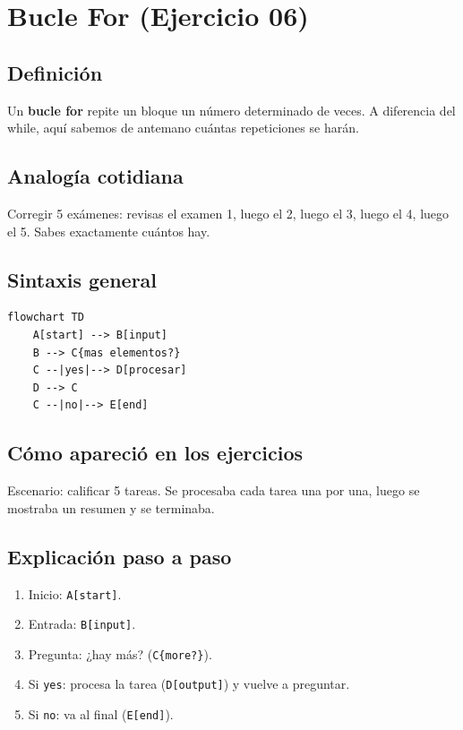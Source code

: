 \documentclass[12pt]{article}
\begin{document}
\newpage

\section{Bucle For (Ejercicio 06)}

\subsection{Definición}

Un \textbf{bucle for} repite un bloque un número determinado de veces. A diferencia del while, aquí sabemos de antemano cuántas repeticiones se harán.

\subsection{Analogía cotidiana}

Corregir 5 exámenes: revisas el examen 1, luego el 2, luego el 3, luego el 4, luego el 5. Sabes exactamente cuántos hay.

\subsection{Sintaxis general}

\begin{lstlisting}[style=mermaidstyle]
flowchart TD
    A[start] --> B[input]
    B --> C{mas elementos?}
    C --|yes|--> D[procesar]
    D --> C
    C --|no|--> E[end]
\end{lstlisting}

\subsection{Cómo apareció en los ejercicios}

Escenario: calificar 5 tareas. Se procesaba cada tarea una por una, luego se mostraba un resumen y se terminaba.

\subsection{Explicación paso a paso}

\begin{enumerate}
    \item Inicio: \texttt{A[start]}.
    \item Entrada: \texttt{B[input]}.
    \item Pregunta: ¿hay más? (\texttt{C\{more?\}}).
    \item Si \texttt{yes}: procesa la tarea (\texttt{D[output]}) y vuelve a preguntar.
    \item Si \texttt{no}: va al final (\texttt{E[end]}).
\end{enumerate}
\end{document}
